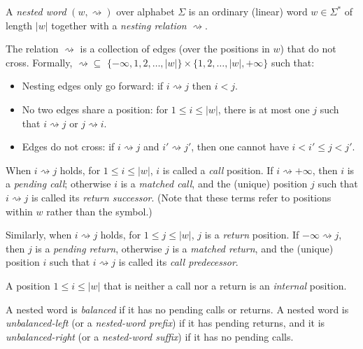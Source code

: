 \begin{definition}
  A \textsl{nested word} $(w,\rightsquigarrow)$ over alphabet $\Sigma$ is an
  ordinary (linear) word $w \in \Sigma^*$ of length $|w|$ together with a
  \textsl{nesting relation} $\rightsquigarrow$.

  The relation $\rightsquigarrow$ is a collection of edges (over the
  positions in $w$) that do not cross. Formally, $\rightsquigarrow \subseteq$
  $\{-\infty, 1, 2, \ldots, |w| \} \times \{1, 2, \ldots, |w|, +\infty\}$
  such that:
  \begin{itemize}
    \item
      Nesting edges only go forward: if $i \rightsquigarrow j$ then $i < j$.
    \item
      No two edges share a position: for $1 \leq i \leq |w|$, there is at
      most one $j$ such that $i \rightsquigarrow j$ or $j \rightsquigarrow
      i$.
    \item
      Edges do not cross: if $i \rightsquigarrow j$ and $i' \rightsquigarrow
      j'$, then one cannot have $i < i' \leq j < j'$.
  \end{itemize}

  When $i \rightsquigarrow j$ holds, for $1 \leq i \leq |w|$, $i$ is called a
  \textsl{call} position. If $i \rightsquigarrow +\infty$, then $i$ is a
  \textsl{pending call}; otherwise $i$ is a \textsl{matched call}, and the
  (unique) position $j$ such that $i \rightsquigarrow j$ is called its
  \textsl{return successor}. (Note that these terms refer to positions within
  $w$ rather than the symbol.)

  Similarly, when $i \rightsquigarrow j$ holds, for $1 \leq j \leq |w|$, $j$
  is a \textsl{return} position. If $-\infty \rightsquigarrow j$, then $j$ is
  a \textsl{pending return}, otherwise $j$ is a \textsl{matched return}, and
  the (unique) position $i$ such that $i \rightsquigarrow j$ is called its
  \textsl{call predecessor}.

  A position $1 \leq i \leq |w|$ that is neither a call nor a return is an
  \textsl{internal} position.

  A nested word is \textsl{balanced} if it has no pending calls
  or returns.  A nested word is \textsl{unbalanced-left} (or a
  \textsl{nested-word prefix}) if it has pending returns, and it is
  \textsl{unbalanced-right} (or a \textsl{nested-word suffix})
  if it has no pending calls.

\end{definition}

